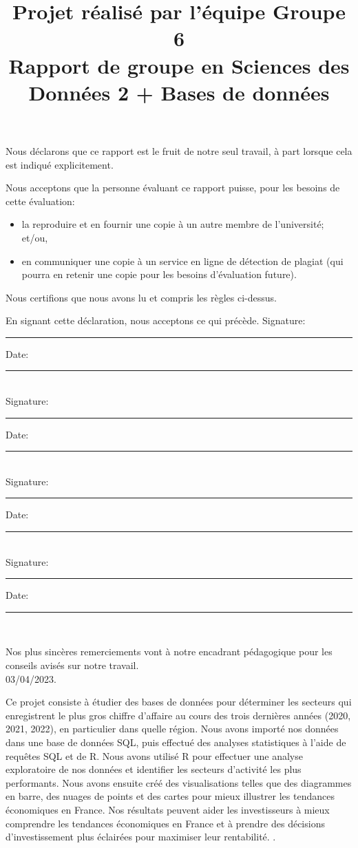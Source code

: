 \documentclass[mstat,12pt]{unswthesis}
\title{Projet réalisé par l'équipe Groupe 6\\[0.5cm]Rapport de groupe en
Sciences des Données 2 + Bases de données}
\author{\Authornameonly}
\begin{document}
\beforepreface




\vskip 2pc \noindent Nous déclarons que ce rapport est le fruit de notre seul travail, à part lorsque cela est indiqué  explicitement. 

\vskip 2pc  \noindent Nous acceptons que la personne évaluant ce rapport puisse, pour les besoins de cette évaluation:
\begin{itemize}
\item la reproduire et en fournir une copie à un autre membre de l'université; et/ou,
\item en communiquer une copie à un service en ligne de détection de plagiat (qui pourra en retenir une copie pour les besoins d'évaluation future).
\end{itemize}

\vskip 2pc \noindent Nous certifions que nous avons lu et compris les règles ci-dessus.\vspace{24pt}

\vskip 2pc \noindent En signant cette déclaration, nous acceptons ce qui précède.
\vskip 2pc \noindent
Signature: \rule{7cm}{0.25pt} \hfill Date: \rule{4cm}{0.25pt} \\[1cm]
Signature: \rule{7cm}{0.25pt} \hfill Date: \rule{4cm}{0.25pt} \\[1cm]
Signature: \rule{7cm}{0.25pt} \hfill Date: \rule{4cm}{0.25pt} \\[1cm]
Signature: \rule{7cm}{0.25pt} \hfill Date: \rule{4cm}{0.25pt} \\[1cm]
\vskip 1pc





{\bigskip}Nos plus sincères remerciements vont à notre encadrant
pédagogique pour les conseils avisés sur notre travail.\\[1cm] 

{\bigskip\bigskip\bigskip\noindent} 03/04/2023.




Ce projet consiste à étudier des bases de données pour déterminer les
secteurs qui enregistrent le plus gros chiffre d'affaire au cours des
trois dernières années (2020, 2021, 2022), en particulier dans quelle
région. Nous avons importé nos données dans une base de données SQL,
puis effectué des analyses statistiques à l'aide de requêtes SQL et de
R. Nous avons utilisé R pour effectuer une analyse exploratoire de nos
données et identifier les secteurs d'activité les plus performants. Nous
avons ensuite créé des visualisations telles que des diagrammes en
barre, des nuages de points et des cartes pour mieux illustrer les
tendances économiques en France. Nos résultats peuvent aider les
investisseurs à mieux comprendre les tendances économiques en France et
à prendre des décisions d'investissement plus éclairées pour maximiser
leur rentabilité. .
\end{document}
